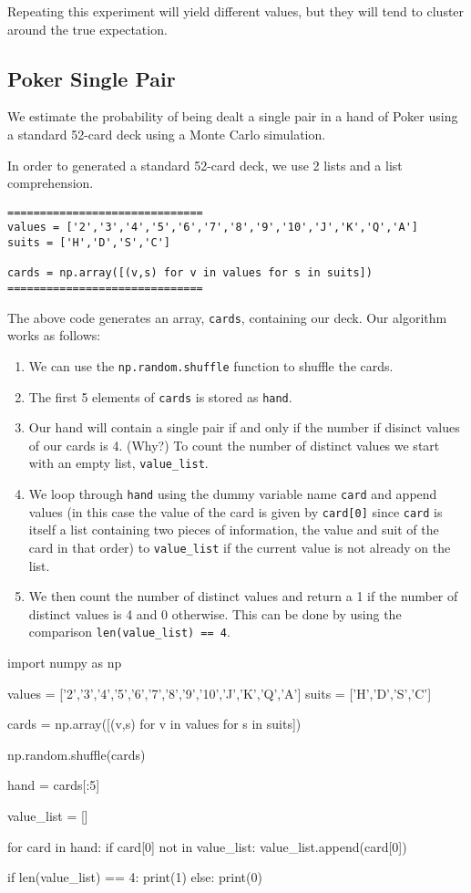 \documentclass{ximera}
\begin{document}
Repeating this experiment will yield different values, but they will tend to cluster around the true expectation. 

\subsection{Poker Single Pair}

We estimate the probability of being dealt a single pair in a hand of Poker using a standard 52-card deck using a Monte Carlo simulation.

In order to generated a standard 52-card deck, we use 2 lists and a list comprehension.

\begin{verbatim}
==============================
values = ['2','3','4','5','6','7','8','9','10','J','K','Q','A']
suits = ['H','D','S','C']

cards = np.array([(v,s) for v in values for s in suits])
==============================
\end{verbatim}

The above code generates an array, \verb|cards|, containing our deck. Our algorithm works as follows:

\begin{enumerate}
	\item We can use the \verb|np.random.shuffle| function to shuffle the cards.
	\item The first 5 elements of \verb|cards| is stored as \verb|hand|. 
	\item Our hand will contain a single pair if and only if the number if disinct values of our cards is 4. (Why?) To count the number of distinct values we start with an empty list, \verb|value_list|. 
	\item We loop through \verb|hand| using the dummy variable name \verb|card| and append values (in this case the value of the card is given by \verb|card[0]| since \verb|card| is itself a list containing two pieces of information, the value and suit of the card in that order) to \verb|value_list| if the current value is not already on the list. 
	\item We then count the number of distinct values and return a 1 if the number of distinct values is 4 and 0 otherwise. This can be done by using the comparison \verb|len(value_list) == 4|.
\end{enumerate}

\begin{sageCell}
import numpy as np

values = ['2','3','4','5','6','7','8','9','10','J','K','Q','A']
suits = ['H','D','S','C']

cards = np.array([(v,s) for v in values for s in suits])

np.random.shuffle(cards)

hand = cards[:5]

value_list = []

for card in hand:
        if card[0] not in value_list:
                value_list.append(card[0])

if len(value_list) == 4:
        print(1)
else:
        print(0)
\end{sageCell}
\end{document}
